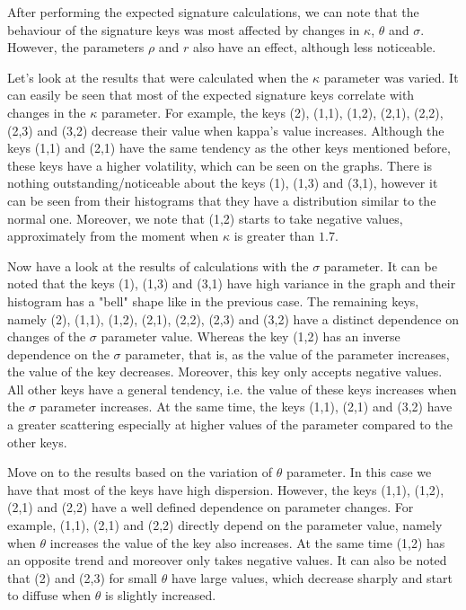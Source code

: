 \documentclass[12pt,a4paper]{report}
\theoremstyle{definition}
\begin{document}
After performing the expected signature calculations, we can note that the behaviour of the signature keys was most affected by changes in $\kappa$, $\theta$ and $\sigma$. However, the parameters $\rho$ and $r$ also have an effect, although less noticeable.

Let's look at the results that were calculated when the $\kappa$ parameter was varied. It can easily be seen that most of the expected signature keys correlate with changes in the $\kappa$ parameter. For example, the keys (2), (1,1), (1,2), (2,1), (2,2), (2,3) and (3,2) decrease their value when kappa's value increases. Although the keys (1,1) and (2,1) have the same tendency as the other keys mentioned before, these keys have a higher volatility, which can be seen on the graphs. There is nothing outstanding/noticeable about the keys (1), (1,3) and (3,1), however it can be seen from their histograms that they have a distribution similar to the normal one. Moreover, we note that (1,2) starts to take negative values, approximately from the moment when $\kappa$ is greater than $1.7$.

Now have a look at the results of calculations with the $\sigma$ parameter. It can be noted that the keys (1), (1,3) and (3,1) have high variance in the graph and their histogram has a "bell" shape like in the previous case. The remaining keys, namely (2), (1,1), (1,2), (2,1), (2,2), (2,3) and (3,2) have a distinct dependence on changes of the $\sigma$ parameter value. Whereas the key (1,2) has an inverse dependence on the $\sigma$ parameter, that is, as the value of the parameter increases, the value of the key decreases. Moreover, this key only accepts negative values. All other keys have a general tendency, i.e. the value of these keys increases when the $\sigma$ parameter increases. At the same time, the keys (1,1), (2,1) and (3,2) have a greater scattering especially at higher values of the parameter compared to the other keys.

Move on to the results based on the variation of $\theta$ parameter. In this case we have that most of the keys have high dispersion. However, the keys (1,1), (1,2), (2,1) and (2,2) have a well defined dependence on parameter changes. For example, (1,1), (2,1) and (2,2) directly depend on the parameter value, namely when $\theta$ increases the value of the key also increases. At the same time (1,2) has an opposite trend and moreover only takes negative values. It can also be noted that (2) and (2,3) for small $\theta$ have large values, which decrease sharply and start to diffuse when $\theta$ is slightly increased.
\end{document}
